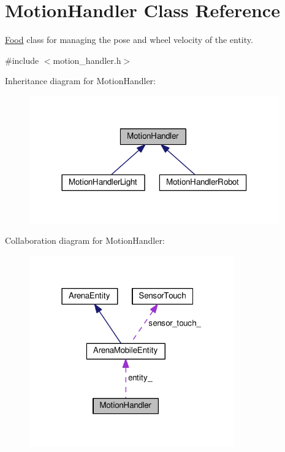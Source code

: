 \hypertarget{classMotionHandler}{}\section{Motion\+Handler Class Reference}
\label{classMotionHandler}


\hyperlink{classFood}{Food} class for managing the pose and wheel velocity of the entity.  




{\ttfamily \#include $<$motion\+\_\+handler.\+h$>$}



Inheritance diagram for Motion\+Handler\+:\nopagebreak
\begin{figure}[H]
\begin{center}
\leavevmode
\includegraphics[width=306pt]{classMotionHandler__inherit__graph}
\end{center}
\end{figure}


Collaboration diagram for Motion\+Handler\+:\nopagebreak
\begin{figure}[H]
\begin{center}
\leavevmode
\includegraphics[width=250pt]{classMotionHandler__coll__graph}
\end{center}
\end{figure}
